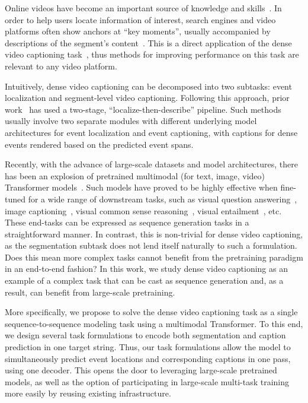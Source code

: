 \documentclass[11pt]{article}
\begin{document}
Online videos have become an important source of knowledge and skills~\citep{oneil-hart_2017}. In order to help users locate information of interest, search engines and video platforms often show anchors at ``key moments'', usually accompanied by descriptions of the segment's content~\citep{baheti_2019}.
This is a direct application of the dense video captioning task~\citep{Krishna2017DenseCaptioningEI}, thus methods for improving performance on this task are  relevant to any video platform.

Intuitively, dense video captioning can be decomposed into two subtasks: event localization and segment-level video captioning. Following this approach, 
prior work~\citep{Krishna2017DenseCaptioningEI,ZhXuCoAAAI18,Li2018JointlyLA,Wang2018BidirectionalAF,Zhou2018EndtoEndDV,Mun2019StreamlinedDV,Iashin2020MultimodalDV} has used a two-stage, ``localize-then-describe'' pipeline.
Such methods usually involve two separate modules with different underlying model architectures for event localization and event captioning, with captions for dense events rendered based on the predicted event spans. 

Recently, with the advance of large-scale datasets and model architectures, there has been an explosion of pretrained multimodal (for text, image, video) Transformer models~\citep{Tan2019LXMERTLC,Sun2019VideoBERTAJ, Li2019VisualBERTAS, Luo2020UniViLMAU, Li2020UnicoderVLAU,Li2020OscarOA, Gan2020LargeScaleAT, Kim2021ViLTVT}.
Such models have proved to be highly effective when fine-tuned for a wide range of downstream tasks, such as visual question answering~\citep{Agrawal2015VQAVQ}, image captioning~\citep{cococap}, visual common sense reasoning~\citep{Zellers2019FromRT}, visual entailment~\citep{Xie2019VisualEA}, etc. 
These end-tasks can be expressed as sequence generation tasks in a straightforward manner.
In contrast, this is non-trivial for dense video captioning, as the segmentation subtask does not lend itself naturally to such a formulation.
Does this mean more complex tasks cannot benefit from the pretraining paradigm in an end-to-end fashion?
In this work, we study dense video captioning as an example of a complex task that can be cast as sequence generation and, as a result, can benefit from large-scale pretraining.

More specifically, we propose to solve the dense video captioning task as a single sequence-to-sequence modeling task using a multimodal Transformer.
To this end, we design several task formulations to encode both segmentation and caption prediction in one target string. Thus, our task formulations allow the model to simultaneously predict event locations and corresponding captions in one pass, using one decoder. 
This opens the door to leveraging large-scale pretrained models, as well as the option of participating in large-scale multi-task training more easily by reusing existing infrastructure.
\end{document}

